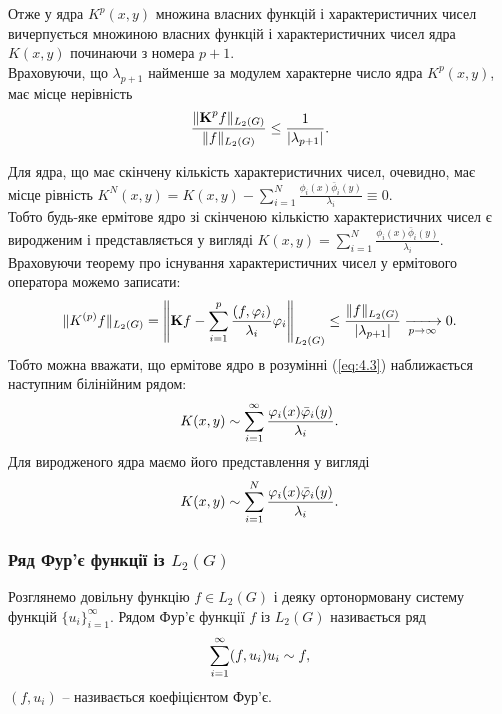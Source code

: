 Отже у ядра $K^p(x, y)$ множина власних функцій і характеристичних чисел вичерпується множиною власних функцій і характеристичних чисел ядра $K(x, y)$ починаючи з номера $p + 1$. \\

Враховуючи, що $\lambda_{p + 1}$ найменше за модулем характерне число ядра $K^p(x, y)$, має місце нерівність \[ \dfrac{\|\bf{K}^p f\|_{L_2(G)}}{\|f\|_{L_2(G)}} \le \dfrac{1}{|\lambda_{p + 1}|}. \]

Для ядра, що має скінчену кількість характеристичних чисел, очевидно, має місце рівність $K^N(x, y) = K(x, y) - \sum_{i = 1}^N \frac{\phi_i(x) \bar \phi_i(y)}{\lambda_i} \equiv 0$. \\

Тобто будь-яке ермітове ядро зі скінченою кількістю характеристичних чисел є виродженим і представляється у вигляді $K(x, y) = \sum_{i = 1}^N \frac{\phi_i(x) \bar \phi_i(y)}{\lambda_i}$. \\

Враховуючи теорему про існування характеристичних чисел у ермітового оператора можемо записати:
\begin{equation}
	\label{eq:4.3}
	\| K^{(p)} f \|_{L_2(G)} = \left\| \bf{K}f - \Sum_{i = 1}^p \dfrac{(f, \phi_i)}{\lambda_i} \phi_i \right\|_{L_2(G)} \le \dfrac{\|f\|_{L_2(G)}}{|\lambda_{p + 1}|} \xrightarrow[p\to\infty]{} 0.
\end{equation}
Тобто можна вважати, що ермітове ядро в розумінні (\ref{eq:4.3}) наближається наступним білінійним рядом:
\begin{equation}
	\label{eq:4.4}
	K(x, y) \sim \Sum_{i = 1}^\infty \dfrac{\phi_i(x) \bar \phi_i(y)}{\lambda_i}.
\end{equation}
Для виродженого ядра маємо його представлення у вигляді
\begin{equation}
	\label{eq:4.5}
	K(x, y) \sim \Sum_{i = 1}^N \dfrac{\phi_i(x) \bar \phi_i(y)}{\lambda_i}.
\end{equation}

\subsubsection*{Ряд Фур'є функції із $L_2(G)$}

Розглянемо довільну функцію $f \in L_2(G)$ і деяку ортонормовану систему функцій $\{ u_i \}_{i = 1}^\infty$. Рядом Фур'є функції $f$ із $L_2(G)$ називається ряд
\begin{equation}
	\label{eq:4.6}
	\Sum_{i = 1}^\infty (f, u_i) u_i \sim f,
\end{equation}
$(f, u_i)$ -- називається коефіцієнтом Фур'є. \\

